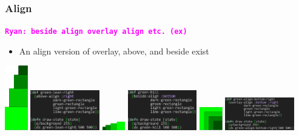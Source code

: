 \documentclass{beamer}
\newcommand{\comment}[1]{{\bf \tt  {#1}}}
\newcommand{\rmcomment}[1]{\textcolor{magenta}{\comment{Ryan: {#1}}}}
\begin{document}
\begin{frame}
\frametitle{Align}
\rmcomment{beside align overlay align etc. (ex)}
	\begin{itemize}
		\item An align version of overlay, above, and beside exist
	\end{itemize}
	\includegraphics[width=1cm]{PresentationImages/greenLeanRight.png}
	\includegraphics[width=3cm]{PresentationImages/greenLeanRightCode.png}
	\includegraphics[width=1cm]{PresentationImages/greenSlopeBottom.png}
	\includegraphics[width=3cm]{PresentationImages/greenSlopeBottomCode.png}
	\includegraphics[width=1cm]{PresentationImages/greenAlignBottomRight.png}
	\includegraphics[width=3cm]{PresentationImages/greenAlignBottomRightCode.png}
\end{frame}
\end{document}
